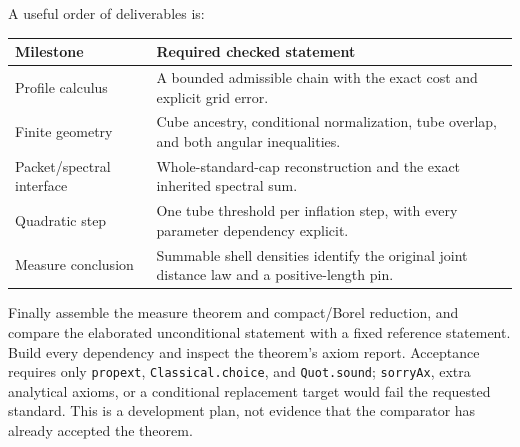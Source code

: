 \documentclass[11pt]{article}
\theoremstyle{definition}\newtheorem{remark}[theorem]{Remark}
\begin{document}
A useful order of deliverables is:
\begin{center}
\small
\begin{tabular}{>{\raggedright\arraybackslash}p{}>{\raggedright\arraybackslash}p{}}
\toprule
Milestone & Required checked statement \\
\midrule
Profile calculus & A bounded admissible chain with the exact cost and explicit grid error. \\
Finite geometry & Cube ancestry, conditional normalization, tube overlap, and both angular inequalities. \\
Packet/spectral interface & Whole-standard-cap reconstruction and the exact inherited spectral sum. \\
Quadratic step & One tube threshold per inflation step, with every parameter dependency explicit. \\
Measure conclusion & Summable shell densities identify the original joint distance law and a positive-length pin. \\
\bottomrule
\end{tabular}
\end{center}

Finally assemble the measure theorem and compact/Borel reduction, and compare
the elaborated unconditional statement with a fixed reference statement.
Build every dependency and inspect the theorem's axiom report. Acceptance
requires only \texttt{propext}, \texttt{Classical.choice}, and
\texttt{Quot.sound}; \texttt{sorryAx}, extra analytical axioms, or a conditional
replacement target would fail the requested standard. This is a development
plan, not evidence that the comparator has already accepted the theorem.
\endgroup


\end{document}
